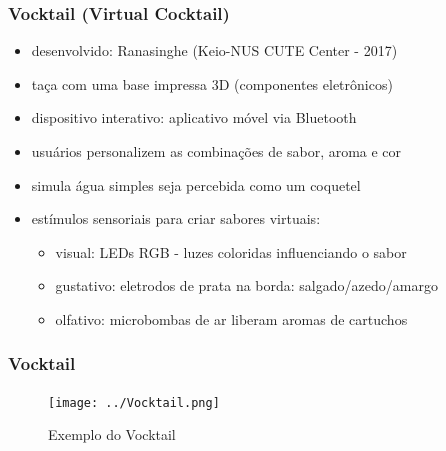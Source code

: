 \documentclass{beamer}
\begin{document}
\begin{frame}
  \frametitle{Vocktail (Virtual Cocktail)}
  \begin{itemize}
    \item desenvolvido: Ranasinghe (Keio-NUS CUTE Center - 2017)
    \item taça com uma base impressa 3D (componentes eletrônicos)
    \item dispositivo interativo: aplicativo móvel via Bluetooth
    \item usuários personalizem as combinações de sabor, aroma e cor
    \item simula água simples seja percebida como um coquetel
    \item estímulos sensoriais para criar sabores virtuais:
    \begin{itemize}
      \item visual: LEDs RGB - luzes coloridas influenciando o sabor
      \item gustativo: eletrodos de prata na borda: salgado/azedo/amargo
      \item olfativo: microbombas de ar liberam aromas de cartuchos
    \end{itemize}
  \end{itemize}
\end{frame}

\begin{frame}
  \frametitle{Vocktail}
  \begin{figure}[h]
    \centering
    \caption{Exemplo do Vocktail}
    \vspace{-8pt}
    \texttt{[image: ../Vocktail.png]}
  \end{figure}
\end{frame}

\end{document}
